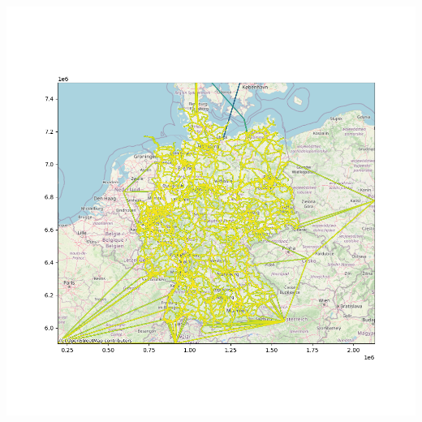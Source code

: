 \documentclass[aspectratio=169,t]{beamer}
\begin{document}
\begin{frame}
\begin{minipage}{1\linewidth}
\begin{minipage}{.6\linewidth}
\includegraphics[width=.8\linewidth]{line.png}



\end{minipage}
\end{minipage}	
		
			
		
	\end{frame}
\end{document}
